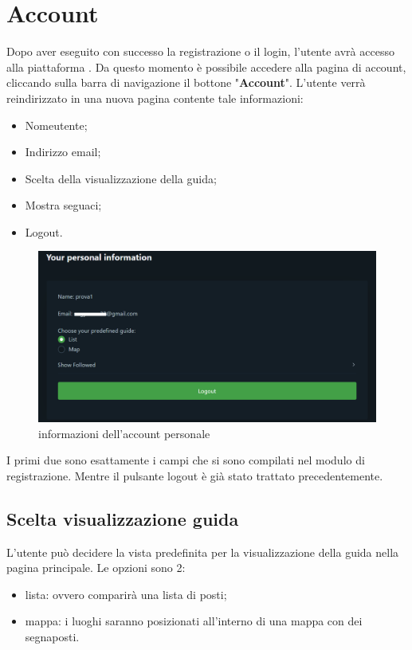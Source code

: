\section{Account} {
    Dopo aver eseguito con successo la registrazione o il login, l'utente avrà accesso alla piattaforma \platform. Da questo momento
    è possibile accedere alla pagina di account, cliccando sulla barra di navigazione il bottone "\textbf{Account}". L'utente verrà reindirizzato
    in una nuova pagina contente tale informazioni: 
    \begin{itemize}
        \item Nomeutente;
        \item Indirizzo email;
        \item Scelta della visualizzazione della guida;
        \item Mostra seguaci;
        \item Logout.
    \end{itemize}

    \begin{figure}[H]
        \includegraphics[width=14cm]{sezioni/images/account.png}
        \centering
        \caption{informazioni dell'account personale}
    \end{figure}

    I primi due sono esattamente i campi che si sono compilati nel modulo di registrazione.
    Mentre il pulsante logout è già stato trattato precedentemente. 

    \subsection{Scelta visualizzazione guida} {
        L'utente può decidere la vista predefinita per la visualizzazione della guida nella pagina principale. 
        Le opzioni sono 2: 
        \begin{itemize}
            \item lista: ovvero comparirà una lista di posti;
            \item mappa: i luoghi saranno posizionati all'interno di una mappa con dei segnaposti.
        \end{itemize}
    }


}

